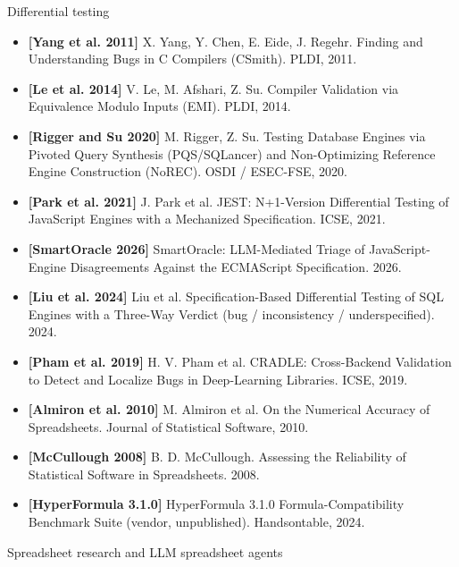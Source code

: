 \documentclass[
]{article}
\providecommand{\tightlist}{%
  \setlength{\itemsep}{0pt}\setlength{\parskip}{0pt}}
\begin{document}
Differential testing

\begin{itemize}
\tightlist
\item
  \textbf{{[}Yang et al. 2011{]}} X. Yang, Y. Chen, E. Eide, J. Regehr.
  Finding and Understanding Bugs in C Compilers (CSmith). PLDI, 2011.
\item
  \textbf{{[}Le et al. 2014{]}} V. Le, M. Afshari, Z. Su. Compiler
  Validation via Equivalence Modulo Inputs (EMI). PLDI, 2014.
\item
  \textbf{{[}Rigger and Su 2020{]}} M. Rigger, Z. Su. Testing Database
  Engines via Pivoted Query Synthesis (PQS/SQLancer) and Non-Optimizing
  Reference Engine Construction (NoREC). OSDI / ESEC-FSE, 2020.
\item
  \textbf{{[}Park et al. 2021{]}} J. Park et al. JEST: N+1-Version
  Differential Testing of JavaScript Engines with a Mechanized
  Specification. ICSE, 2021.
\item
  \textbf{{[}SmartOracle 2026{]}} SmartOracle: LLM-Mediated Triage of
  JavaScript-Engine Disagreements Against the ECMAScript Specification.
  2026.
\item
  \textbf{{[}Liu et al. 2024{]}} Liu et al. Specification-Based
  Differential Testing of SQL Engines with a Three-Way Verdict (bug /
  inconsistency / underspecified). 2024.
\item
  \textbf{{[}Pham et al. 2019{]}} H. V. Pham et al. CRADLE:
  Cross-Backend Validation to Detect and Localize Bugs in Deep-Learning
  Libraries. ICSE, 2019.
\item
  \textbf{{[}Almiron et al. 2010{]}} M. Almiron et al. On the Numerical
  Accuracy of Spreadsheets. Journal of Statistical Software, 2010.
\item
  \textbf{{[}McCullough 2008{]}} B. D. McCullough. Assessing the
  Reliability of Statistical Software in Spreadsheets. 2008.
\item
  \textbf{{[}HyperFormula 3.1.0{]}} HyperFormula 3.1.0
  Formula-Compatibility Benchmark Suite (vendor, unpublished).
  Handsontable, 2024.
\end{itemize}

Spreadsheet research and LLM spreadsheet agents
\end{document}
